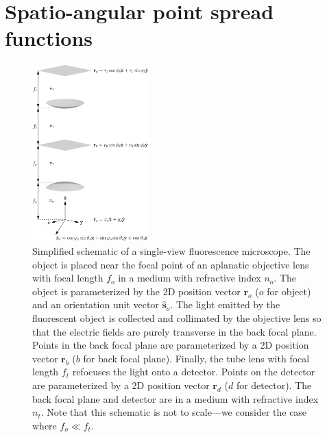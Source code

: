 \documentclass[11pt]{article}
\providecommand{\ro}[1]{\mathbf{\mathbf{r}}_o}
\providecommand{\so}[1]{\mathbf{\hat{s}}_o}
\providecommand{\rb}[1]{\mathbf{r}_b}
\providecommand{\rd}[1]{\mathbf{r}_d}
\begin{document}
\section{Spatio-angular point spread functions}
\begin{figure}[h]
 \captionsetup{width=1.0\linewidth}
 \centering
   \centering
   \includegraphics[width = 0.4\textwidth]{../figures/schematic.pdf}
   \caption{Simplified schematic of a single-view fluorescence microscope. The
     object is placed near the focal point of an aplanatic objective lens with
     focal length $f_{o}$ in a medium with refractive index $n_o$. The object is
     parameterized by the 2D position vector $\ro{}$ ($o$ for object) and an
     orientation unit vector $\so{}$. The light emitted by the fluorescent
     object is collected and collimated by the objective lens so that the
     electric fields are purely transverse in the back focal plane. Points in
     the back focal plane are parameterized by a 2D position vector $\rb{}$ ($b$
     for back focal plane). Finally, the tube lens with focal length $f_t$
     refocuses the light onto a detector. Points on the detector are
     parameterized by a 2D position vector $\rd{}$ ($d$ for detector). The back
     focal plane and detector are in a medium with refractive index $n_t$. Note
     that this schematic is not to scale---we consider the case where
     $f_o \ll f_t$.}
   \label{fig:frames_a}
\end{figure}
\end{document}
